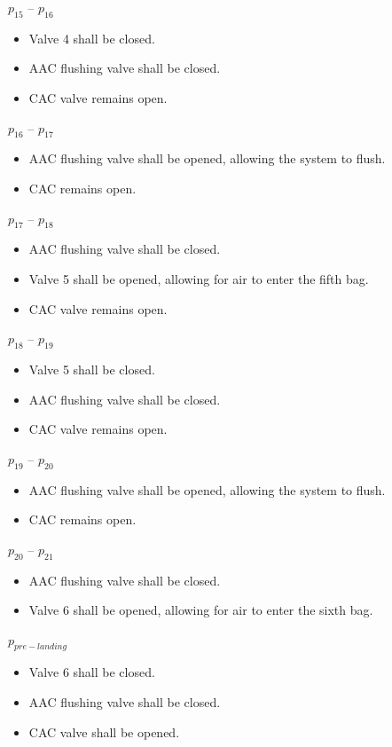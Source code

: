 \documentclass[a4paper,12pt,oneside]{article} %
\begin{document}
$p_{15}$ – $p_{16}$
\begin{itemize}
    \item Valve 4 shall be closed.
    \item AAC flushing valve shall be closed.
    \item CAC valve remains open.
\end{itemize}

$p_{16}$ – $p_{17}$
\begin{itemize}
    \item AAC flushing valve shall be opened, allowing the system to flush. 
    \item CAC remains open.
  \end{itemize}

$p_{17}$ – $p_{18}$
\begin{itemize}
    \item AAC flushing valve shall be closed.
    \item Valve 5 shall be opened, allowing for air to enter the fifth bag. 
    \item CAC valve remains open.
\end{itemize}

$p_{18}$ – $p_{19}$
\begin{itemize}
    \item Valve 5 shall be closed.
    \item AAC flushing valve shall be closed.
    \item CAC valve remains open.
\end{itemize}

$p_{19}$ – $p_{20}$
\begin{itemize}
     \item AAC flushing valve shall be opened, allowing the system to flush. 
    \item CAC remains open.
   \end{itemize}

$p_{20}$ – $p_{21}$
\begin{itemize}
    \item AAC flushing valve shall be closed.
    \item Valve 6 shall be opened, allowing for air to enter the sixth bag.
\end{itemize}

$p_{pre-landing}$ 
\begin{itemize}
    \item Valve 6 shall be closed.
    \item AAC flushing valve shall be closed.
    \item CAC valve shall be opened.
\end{itemize}
\end{document}
